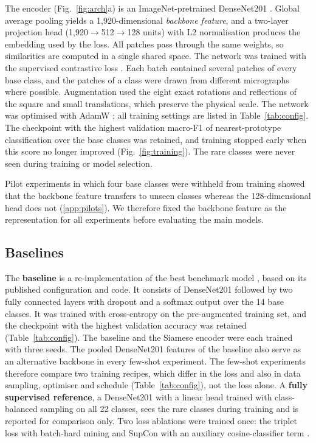 \documentclass[preprint,review,12pt]{elsarticle}
\begin{document}
The encoder (Fig.~\ref{fig:arch}a) is an ImageNet-pretrained DenseNet201 \cite{Hua17,Den09}. Global average pooling yields a 1,920-dimensional \emph{backbone feature}, and a two-layer projection head (1,920$\to$512$\to$128 units) with L2 normalisation produces the embedding used by the loss. All patches pass through the same weights, so similarities are computed in a single shared space. The network was trained with the supervised contrastive loss \cite{Kho20}. Each batch contained several patches of every base class, and the patches of a class were drawn from different micrographs where possible. Augmentation used the eight exact rotations and reflections of the square and small translations, which preserve the physical scale. The network was optimised with AdamW \cite{LH19}; all training settings are listed in Table~\ref{tab:config}. The checkpoint with the highest validation macro-F1 of nearest-prototype classification over the base classes was retained, and training stopped early when this score no longer improved (Fig.~\ref{fig:training}). The rare classes were never seen during training or model selection.

Pilot experiments in which four base classes were withheld from training showed that the backbone feature transfers to unseen classes whereas the 128-dimensional head does not (\ref{app:pilots}). We therefore fixed the backbone feature as the representation for all experiments before evaluating the main models.

\subsection{Baselines}
\label{sec:baselines}

The \textbf{baseline} is a re-implementation of the best benchmark model \cite{MS21}, based on its published configuration and code. It consists of DenseNet201 followed by two fully connected layers with dropout and a softmax output over the 14 base classes. It was trained with cross-entropy on the pre-augmented training set, and the checkpoint with the highest validation accuracy was retained (Table~\ref{tab:config}). The baseline and the Siamese encoder were each trained with three seeds. The pooled DenseNet201 features of the baseline also serve as an alternative backbone in every few-shot experiment. The few-shot experiments therefore compare two training recipes, which differ in the loss and also in data sampling, optimiser and schedule (Table~\ref{tab:config}), not the loss alone. A \textbf{fully supervised reference}, a DenseNet201 with a linear head trained with class-balanced sampling on all 22 classes, sees the rare classes during training and is reported for comparison only. Two loss ablations were trained once: the triplet loss with batch-hard mining \cite{Luo19} and SupCon with an auxiliary cosine-classifier term \cite{Che19}.
\end{document}
